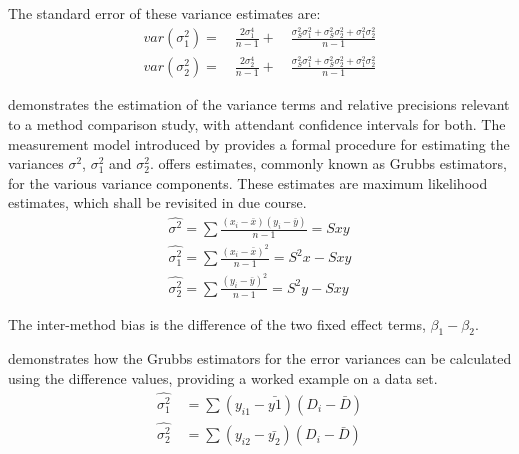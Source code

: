 \documentclass[12pt, a4paper]{report}
\theoremstyle{plain}
\theoremstyle{definition}
\theoremstyle{remark}
\begin{document}
The standard error of these variance estimates are:
\begin{eqnarray}
var(\sigma^{2}_{1}) =\quad \frac{2\sigma^{4}_{1}}{n-1} +\quad
\frac{\sigma^2_{S}\sigma^2_{1}+\sigma^2_{S}\sigma^2_{2}+\sigma^2_{1}\sigma^2_{2}
}{n-1}\\
var(\sigma^{2}_{2}) =\quad \frac{2\sigma^{4}_{2}}{n-1} +\quad
\frac{\sigma^2_{S}\sigma^2_{1}+\sigma^2_{S}\sigma^2_{2}+\sigma^2_{1}\sigma^2_{2}
}{n-1}\nonumber
\end{eqnarray}


\citet{Kinsella} demonstrates the estimation of the variance terms and relative precisions relevant to a method comparison study, with attendant confidence intervals for both. The measurement model introduced by \citet{Grubbs48,Grubbs73} provides a formal procedure for estimating the variances $\sigma^2$, $\sigma^2_{1}$ and $\sigma^2_{2}$. \citet{Grubbs48} offers estimates, commonly known as Grubbs estimators, for the various variance components. These estimates are maximum likelihood estimates, which shall be revisited in due course.
\begin{eqnarray*}
	\hat{\sigma^{2}} = \sum{\frac{(x_{i}-\bar{x})(y_{i}-\bar{y})}{n-1}} = Sxy\\
	\hat{\sigma^{2}_{1}} = \sum{\frac{(x_{i}-\bar{x})^{2}}{n-1}} =S^{2}x - Sxy  \\
	\hat{\sigma^{2}_{2}} =
	\sum{\frac{(y_{i}-\bar{y})^{2}}{n-1}} = S^{2}y - Sxy
\end{eqnarray*}


The inter-method bias is the difference of the two fixed effect terms, $\beta_{1}-\beta_{2}$.

\citet{Kinsella} demonstrates how the Grubbs estimators for the
error variances can be calculated using the difference values,
providing a worked example on a data set.
\begin{eqnarray}
\hat{\sigma^{2}_{1}}
\quad=\sum{(y_{i1}-\bar{y{1}})(D_{i}-\bar{D})}\\
\hat{\sigma^{2}_{2}} \quad=
\sum{(y_{i2}-\bar{y_{2}})(D_{i}-\bar{D})} \nonumber
\end{eqnarray}
\end{document}
